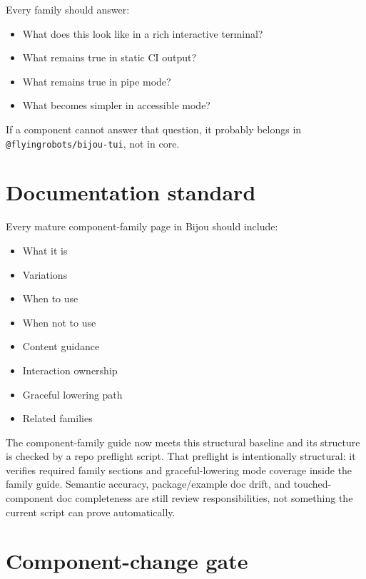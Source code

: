 Every family should answer:

\begin{itemize}
\tightlist
\item
  What does this look like in a rich interactive terminal?
\item
  What remains true in static CI output?
\item
  What remains true in pipe mode?
\item
  What becomes simpler in accessible mode?
\end{itemize}

If a component cannot answer that question, it probably belongs in \texttt{@\allowbreak{}f\allowbreak{}l\allowbreak{}y\allowbreak{}i\allowbreak{}n\allowbreak{}g\allowbreak{}r\allowbreak{}o\allowbreak{}b\allowbreak{}o\allowbreak{}t\allowbreak{}s\allowbreak{}/\allowbreak{}b\allowbreak{}i\allowbreak{}j\allowbreak{}o\allowbreak{}u\allowbreak{}-\allowbreak{}t\allowbreak{}u\allowbreak{}i}, not in core.

\section{Documentation standard}\label{record-017-documentation-standard}

Every mature component-family page in Bijou should include:

\begin{itemize}
\tightlist
\item
  What it is
\item
  Variations
\item
  When to use
\item
  When not to use
\item
  Content guidance
\item
  Interaction ownership
\item
  Graceful lowering path
\item
  Related families
\end{itemize}

The component-family guide now meets this structural baseline and its structure is checked by a repo preflight script. That preflight is intentionally structural: it verifies required family sections and graceful-lowering mode coverage inside the family guide. Semantic accuracy, package/example doc drift, and touched-component doc completeness are still review responsibilities, not something the current script can prove automatically.

\section{Component-change gate}\label{record-017-component-change-gate}

